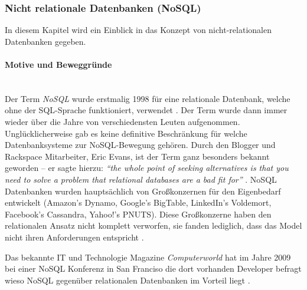 \subsubsection{Nicht relationale Datenbanken (NoSQL)}
\label{subsec:nichtrelationaleDB}

In diesem Kapitel wird ein Einblick in das Konzept von nicht-relationalen Datenbanken gegeben. 

\paragraph{Motive und Beweggründe}\mbox{}\\
Der Term \textit{NoSQL} wurde erstmalig 1998 für eine relationale Datenbank, welche ohne der SQL-Sprache funktioniert, verwendet \cite{MELD.CH2-noSQL.firstSQLNaming}. Der Term wurde dann immer wieder über die Jahre von verschiedensten Leuten aufgenommen. Unglücklicherweise gab es keine definitive Beschränkung für welche Datenbanksysteme zur NoSQL-Bewegung gehören. Durch den Blogger und Rackspace Mitarbeiter, Eric Evans, ist der Term ganz besonders bekannt geworden – er sagte hierzu: \textit{“the whole point of seeking alternatives is that you need to solve a problem that relational databases are a bad fit for”} \cite{MELD.CH2-noSQL.whatsInAName}. NoSQL Datenbanken wurden hauptsächlich von Großkonzernen für den Eigenbedarf entwickelt (Amazon’s Dynamo, Google’s BigTable, LinkedIn’s Voldemort, Facebook’s Cassandra, Yahoo!’s PNUTS). Diese Großkonzerne haben den relationalen Ansatz nicht komplett verworfen, sie fanden lediglich, dass das Model nicht ihren Anforderungen entspricht \cite{MELD.CH2-noSQL.capTheoremComp}.

Das bekannte IT und Technologie Magazine \textit{Computerworld} hat im Jahre 2009 bei einer NoSQL Konferenz in San Franciso die dort vorhanden Developer befragt wieso NoSQL gegenüber relationalen Datenbanken im Vorteil liegt \cite{MELD.CH2-noSQL.whyItsBetter}.

